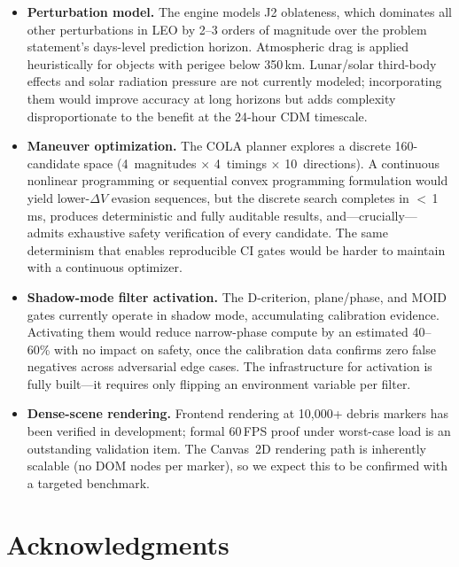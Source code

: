 \documentclass[10pt,twocolumn,letterpaper]{article}
\begin{document}
\begin{itemize}[nosep,leftmargin=*]
  \item \textbf{Perturbation model.}
    The engine models J2 oblateness, which dominates all other
    perturbations in LEO by 2--3 orders of magnitude over the
    problem statement's days-level prediction horizon.  Atmospheric drag
    is applied heuristically for objects with perigee below 350\,km.
    Lunar/solar third-body effects and solar radiation pressure are not
    currently modeled; incorporating them would improve accuracy at long
    horizons but adds complexity disproportionate to the benefit at the
    24-hour CDM timescale.

  \item \textbf{Maneuver optimization.}
    The COLA planner explores a discrete 160-candidate space
    (4~magnitudes $\times$ 4~timings $\times$ 10~directions).  A
    continuous nonlinear programming or sequential convex programming
    formulation would yield lower-$\Delta V$ evasion sequences, but the
    discrete search completes in $<$\,1\,ms, produces deterministic and
    fully auditable results, and---crucially---admits exhaustive
    safety verification of every candidate.  The same determinism that
    enables reproducible CI gates would be harder to maintain with a
    continuous optimizer.

  \item \textbf{Shadow-mode filter activation.}
    The D-criterion, plane/phase, and MOID gates currently operate in
    shadow mode, accumulating calibration evidence.  Activating them would
    reduce narrow-phase compute by an estimated 40--60\% with no
    impact on safety, once the calibration data confirms zero false
    negatives across adversarial edge cases.  The infrastructure for
    activation is fully built---it requires only flipping an environment
    variable per filter.

  \item \textbf{Dense-scene rendering.}
    Frontend rendering at 10{,}000+ debris markers has been verified in
    development; formal 60\,FPS proof under worst-case load is an
    outstanding validation item.  The Canvas~2D rendering path is
    inherently scalable (no DOM nodes per marker), so we expect this
    to be confirmed with a targeted benchmark.
\end{itemize}

\section*{Acknowledgments}
\end{document}
